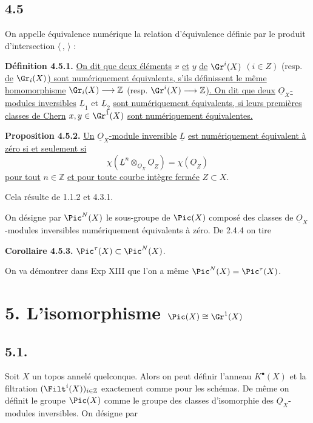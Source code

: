
\subsection*{4.5}
On
appelle équivalence numérique la relation d'équivalence définie par le produit d'intersection \(\langle\, ,\,\rangle\) :

\textbf{Définition 4.5.1.} \uline{On dit que deux éléments} \(x\) \uline{et} \(y\) \uline{de} \(\Gr^i(X)\) \((i\in Z)\) (resp. \uline{de} \(\Gr_i(X)\)\uline{) sont numériquement équivalents, s'ils définissent le même homomorphisme} \(\Gr_i(X)\longrightarrow\mathbb Z\) (resp. \(\Gr^i(X)\longrightarrow\mathbb Z\)\uline{).
On dit que deux} \(\underline{O}_X\)\uline{-modules inversibles} \(\underline{L}_1\) et \(\underline{L}_2\) \uline{sont numériquement équivalents, si leurs premières classes de Chern} \(x,y\in\Gr^1(X)\) \uline{sont numériquement équivalentes.}

\textbf{Proposition 4.5.2.} \uline{Un} \(\underline{O}_X\)\uline{-module inversible} \(\underline{L}\) \uline{est numériquement équivalent à zéro si et seulement si}
\begin{equation}\tag{4.5.3}
 \chi(\underline{L}^n\otimes_{\underline{O}_X}\underline{O}_Z)=\chi(\underline{O}_Z)
\end{equation}
\uline{pour tout} \(n\in\mathbb Z\) \uline{et pour toute courbe intègre fermée} \(Z\subset X\).

Cela résulte de 1.1.2 et 4.3.1.

On désigne par \(\Pic^N(X)\) le sous-groupe de \(\Pic(X)\) composé des classes de \(\underline{O}_X\)-modules inversibles numériquement équivalents à zéro. De 2.4.4 on tire

\textbf{Corollaire 4.5.3.} \(\Pic^\tau(X)\subset \Pic^N(X)\).

On va démontrer dans Exp XIII que l'on a même \(\Pic^N(X)=\Pic^\tau(X)\).

\section*{5. L'isomorphisme \(\Pic(X)\cong\Gr^1(X)\)}

\subsection*{5.1.}
Soit \(X\) un topos annelé quelconque. Alors on peut définir l'anneau \(K^{\bullet}(X)\) et la filtration \((\Filt^i(X))_{i\in\mathbb Z}\) exactement comme pour les schémas. De même on définit le groupe \(\Pic(X)\) comme le groupe des classes d'isomorphie des \(\underline{O}_X\)-modules inversibles. On désigne par

